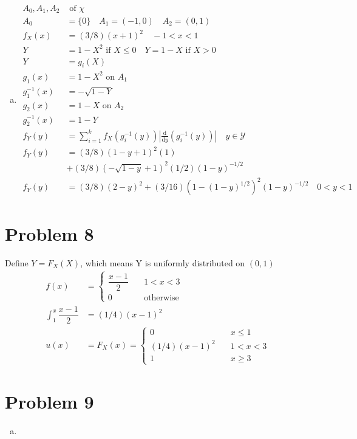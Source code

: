 \documentclass{article}
\newcommand{\yderiv}[1]{\frac{\mathrm{d}}{\mathrm{d}y} (#1)}
\begin{document}
\begin{flushleft}
\begin{enumerate}[(a)]
\item
\begin{align*}
A_0,A_1,A_2 &\text{ of } \chi\\
A_0&=\{0\} \quad A_1=(-1,0) \quad A_2 = (0,1)\\
f_X(x)&=(3/8)(x+1)^2 \quad -1<x<1\\
Y&=1-X^2 \text{ if } X\leq 0
\quad Y=1-X \text{ if } X>0\\
Y&=g_i(X)\\
g_1(x)&=1-X^2 \text{ on } A_1\\
g_1^{-1}(x)&=-\sqrt{1-Y}\\
g_2(x)&=1-X \text{ on } A_2\\
g_2^{-1}(x)&=1-Y\\
f_Y(y)&=\sum_{i=1}^{k}f_X(g_i^{-1}(y))\left|\yderiv{g_i^{-1}(y)}\right| \quad y \in \mathcal{Y}\\
f_Y(y)&=(3/8)(1-y+1)^2(1)\\
&+(3/8)(-\sqrt{1-y}+1)^2(1/2)(1-y)^{-1/2}\\
f_Y(y)&=(3/8)(2-y)^2+(3/16)(1-(1-y)^{1/2})^2(1-y)^{-1/2} \quad 0<y<1
\end{align*}
\end{enumerate}
\section*{Problem 8}
Define $Y=F_X(X)$, which means Y is uniformly distributed on $(0,1)$
\begin{align*}
f(x)&=\begin{cases}
\dfrac{x-1}{2} \quad &1<x<3\\
0 \quad &\text{otherwise}
\end{cases}\\
\int_{1}^{x}\dfrac{x-1}{2}&=(1/4)(x-1)^2\\
u(x)&=F_X(x)=\begin{cases}
0 \quad &x\leq 1\\
(1/4)(x-1)^2 \quad &1<x<3\\
1 \quad &x\geq 3
\end{cases}
\end{align*}
\section*{Problem 9}
\begin{enumerate}[(a)]
\item 

\end{enumerate}

\end{flushleft}
\end{document}
